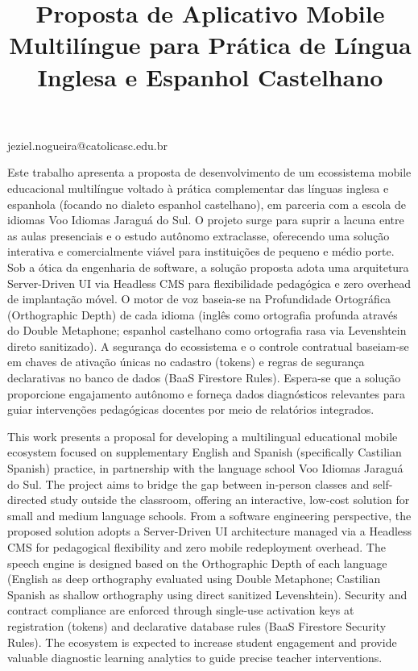 \documentclass[portuguese]{sbcreviews-2025}%
\title[Proposta de Aplicativo Mobile Multilíngue para Prática de Idiomas]{Proposta de Aplicativo Mobile Multilíngue para Prática de Língua Inglesa e Espanhol Castelhano}
\author[Jeziel Nogueira 2026]{
\affil{\textbf{Jeziel Nogueira}~\orcidlink{0000-0000-0000-0000}~\textcolor{blue}{\faEnvelope}~~[{Católica de Santa Catarina}~|\href{mailto:jeziel.nogueira@catolicasc.edu.br}{~{\textit{jeziel.nogueira@catolicasc.edu.br}}}~]}
}
\begin{document}
\begin{frontmatter}

\maketitle

\begin{mail}
jeziel.nogueira@catolicasc.edu.br
\end{mail}

\begin{abstract-pt}
Este trabalho apresenta a proposta de desenvolvimento de um ecossistema mobile educacional multilíngue voltado à prática complementar das línguas inglesa e espanhola (focando no dialeto espanhol castelhano), em parceria com a escola de idiomas Voo Idiomas Jaraguá do Sul. O projeto surge para suprir a lacuna entre as aulas presenciais e o estudo autônomo extraclasse, oferecendo uma solução interativa e comercialmente viável para instituições de pequeno e médio porte. Sob a ótica da engenharia de software, a solução proposta adota uma arquitetura Server-Driven UI via Headless CMS para flexibilidade pedagógica e zero overhead de implantação móvel. O motor de voz baseia-se na Profundidade Ortográfica (Orthographic Depth) de cada idioma (inglês como ortografia profunda através do Double Metaphone; espanhol castelhano como ortografia rasa via Levenshtein direto sanitizado). A segurança do ecossistema e o controle contratual baseiam-se em chaves de ativação únicas no cadastro (tokens) e regras de segurança declarativas no banco de dados (BaaS Firestore Rules). Espera-se que a solução proporcione engajamento autônomo e forneça dados diagnósticos relevantes para guiar intervenções pedagógicas docentes por meio de relatórios integrados.
\end{abstract-pt}

\begin{abstract-en}
This work presents a proposal for developing a multilingual educational mobile ecosystem focused on supplementary English and Spanish (specifically Castilian Spanish) practice, in partnership with the language school Voo Idiomas Jaraguá do Sul. The project aims to bridge the gap between in-person classes and self-directed study outside the classroom, offering an interactive, low-cost solution for small and medium language schools. From a software engineering perspective, the proposed solution adopts a Server-Driven UI architecture managed via a Headless CMS for pedagogical flexibility and zero mobile redeployment overhead. The speech engine is designed based on the Orthographic Depth of each language (English as deep orthography evaluated using Double Metaphone; Castilian Spanish as shallow orthography using direct sanitized Levenshtein). Security and contract compliance are enforced through single-use activation keys at registration (tokens) and declarative database rules (BaaS Firestore Security Rules). The ecosystem is expected to increase student engagement and provide valuable diagnostic learning analytics to guide precise teacher interventions.
\end{abstract-en}


\end{frontmatter}
\end{document}
